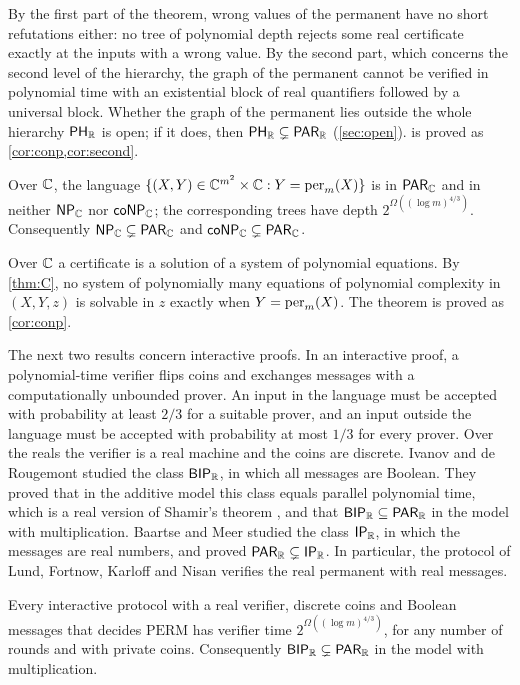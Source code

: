 By the first part of the theorem, wrong values of the permanent have no short refutations either: no tree of polynomial depth rejects some real certificate exactly at the inputs with a wrong value. By the second part, which concerns the second level of the hierarchy, the graph of the permanent cannot be verified in polynomial time with an existential block of real quantifiers followed by a universal block. Whether the graph of the permanent lies outside the whole hierarchy $\textsf{\upshape PH}_{\mathbb{R}}$ is open; if it does, then $\textsf{\upshape PH}_{\mathbb{R}}\subsetneq\textsf{\upshape PAR}_{\mathbb{R}}$ (\cref{sec:open}).  is proved as \cref{cor:conp,cor:second}.

\begin{maintheorem}\label{thm:C}
Over $\mathbb{C}$, the language $\{(X,Y)\in\mathbb{C}^{m^2}\times\mathbb{C}:Y=\operatorname{per}_m(X)\}$ is in $\textsf{\upshape PAR}_{\mathbb{C}}$ and in neither $\textsf{\upshape NP}_{\mathbb{C}}$ nor $\textsf{\upshape coNP}_{\mathbb{C}}$; the corresponding trees have depth $2^{\Omega((\log m)^{4/3})}$. Consequently $\textsf{\upshape NP}_{\mathbb{C}}\subsetneq\textsf{\upshape PAR}_{\mathbb{C}}$ and $\textsf{\upshape coNP}_{\mathbb{C}}\subsetneq\textsf{\upshape PAR}_{\mathbb{C}}$.
\end{maintheorem}

Over $\mathbb{C}$ a certificate is a solution of a system of polynomial equations. By \cref{thm:C}, no system of polynomially many equations of polynomial complexity in $(X,Y,z)$ is solvable in $z$ exactly when $Y=\operatorname{per}_m(X)$. The theorem is proved as \cref{cor:conp}.

The next two results concern interactive proofs. In an interactive proof, a polynomial-time verifier flips coins and exchanges messages with a computationally unbounded prover. An input in the language must be accepted with probability at least $2/3$ for a suitable prover, and an input outside the language must be accepted with probability at most $1/3$ for every prover. Over the reals the verifier is a real machine and the coins are discrete. Ivanov and de Rougemont \cite{IdR99} studied the class $\textsf{\upshape BIP}_{\mathbb{R}}$, in which all messages are Boolean. They proved that in the additive model this class equals parallel polynomial time, which is a real version of Shamir's theorem \cite{Sha92}, and that $\textsf{\upshape BIP}_{\mathbb{R}}\subseteq\textsf{\upshape PAR}_{\mathbb{R}}$ in the model with multiplication. Baartse and Meer \cite{BM16} studied the class $\textsf{\upshape IP}_{\mathbb{R}}$, in which the messages are real numbers, and proved $\textsf{\upshape PAR}_{\mathbb{R}}\subsetneq\textsf{\upshape IP}_{\mathbb{R}}$. In particular, the protocol of Lund, Fortnow, Karloff and Nisan \cite{LFKN92} verifies the real permanent with real messages.

\begin{maintheorem}\label{thm:D}
Every interactive protocol with a real verifier, discrete coins and Boolean messages that decides $\mathrm{PERM}$ has verifier time $2^{\Omega((\log m)^{4/3})}$, for any number of rounds and with private coins. Consequently $\textsf{\upshape BIP}_{\mathbb{R}}\subsetneq\textsf{\upshape PAR}_{\mathbb{R}}$ in the model with multiplication.
\end{maintheorem}

